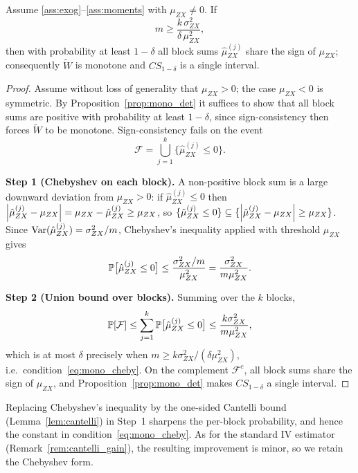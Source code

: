\begin{proposition}
\label{prop:mono_cheby}
Assume \ref{ass:exog}--\ref{ass:moments} with $\mu_{ZX}\neq 0$. If
\begin{equation}
  m \ge \frac{k\,\sigma_{ZX}^2}{\delta\,\mu_{ZX}^2},
  \label{eq:mono_cheby}
\end{equation}
then with probability at least $1-\delta$ all block sums $\hat{\mu}_{ZX}^{(j)}$
share the sign of $\mu_{ZX}$; consequently $\widetilde{W}$ is monotone and
$CS_{1-\delta}$ is a single interval.
\end{proposition}
 
\begin{proof}
Assume without loss of generality that $\mu_{ZX}>0$; the case $\mu_{ZX}<0$ is symmetric. By Proposition~\ref{prop:mono_det} it suffices to show that all block sums are positive with probability at least $1-\delta$, since sign-consistency then forces $\widetilde{W}$ to be monotone. Sign-consistency fails on the event
\[
    \mathcal{F} = \bigcup_{j=1}^{k}\bigl\{\hat{\mu}_{ZX}^{(j)}\le 0\bigr\}.
\]

\medskip\noindent\textbf{Step 1 (Chebyshev on each block).} A non-positive block sum is a large downward deviation from $\mu_{ZX}>0$: if $\hat{\mu}_{ZX}^{(j)}\le 0$ then $\left|\hat{\mu}_{ZX}^{(j)}-\mu_{ZX}\right| = \mu_{ZX}-\hat{\mu}_{ZX}^{(j)}\ge\mu_{ZX}$, so $\{\hat{\mu}_{ZX}^{(j)}\le 0\}\subseteq\{\left|\hat{\mu}_{ZX}^{(j)}-\mu_{ZX}\right|\ge\mu_{ZX}\}$. Since $\operatorname{Var}(\hat{\mu}_{ZX}^{(j)})=\sigma_{ZX}^2/m$, Chebyshev's inequality applied with threshold $\mu_{ZX}$ gives
\[
    \operatorname{\mathbb{P}}\bigl[\hat{\mu}_{ZX}^{(j)}\le 0\bigr]\le\frac{\sigma_{ZX}^2/m}{\mu_{ZX}^2}=\frac{\sigma_{ZX}^2}{m\mu_{ZX}^2}.
\]

\medskip\noindent\textbf{Step 2 (Union bound over blocks).} Summing over the $k$ blocks,
\[
    \operatorname{\mathbb{P}}[\mathcal{F}]\le\sum_{j=1}^{k}\operatorname{\mathbb{P}}\bigl[\hat{\mu}_{ZX}^{(j)}\le 0\bigr]\le\frac{k\sigma_{ZX}^2}{m\mu_{ZX}^2},
\]
which is at most $\delta$ precisely when $m\ge k\sigma_{ZX}^2/(\delta\mu_{ZX}^2)$, i.e.\ condition~\eqref{eq:mono_cheby}. On the complement $\mathcal{F}^c$, all block sums share the sign of $\mu_{ZX}$, and Proposition~\ref{prop:mono_det} makes $CS_{1-\delta}$ a single interval.
\end{proof}
\begin{remark}
\label{rem:mono_cantelli}
Replacing Chebyshev's inequality by the one-sided Cantelli bound (Lemma~\ref{lem:cantelli}) in Step~1 sharpens the per-block probability, and hence the constant in condition~\eqref{eq:mono_cheby}. As for the standard IV estimator (Remark~\ref{rem:cantelli_gain}), the resulting improvement is minor, so we retain the Chebyshev form.
\end{remark}

